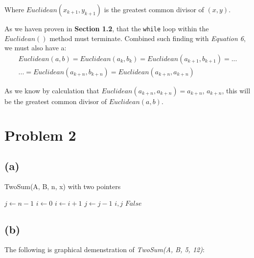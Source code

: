 \documentclass[12pt]{article}
\newcommand{\inlinecode}{\texttt}
\begin{document}
Where $Euclidean(x_{k+1}, y_{k+1})$ is the greatest common divisor of $(x, y)$.\newline


As we haven proven in \textbf{Section 1.2}, that the \inlinecode{while} loop within the $Euclidean()$ method must terminate. Combined such finding with \textit{Equation 6}, we must also have a:
\begin{gather}
    Euclidean(a, b) = Euclidean(a_{k}, b_{k}) = Euclidean(a_{k+1}, b_{k+1}) = ... \\ ... = Euclidean(a_{k+n}, b_{k+n}) = Euclidean(a_{k+n}, a_{k+n}) \nonumber
\end{gather}

As we know by calculation that $Euclidean(a_{k+n}, a_{k+n}) = a_{k+n}$, $a_{k+n}$, this will be the greatest common divisor of $Euclidean(a, b)$.

\section{Problem 2}
\subsection{(a)}

\begin{algorithm}
\caption{TwoSum(A, B, n, x) with two pointers}\label{TwoSum}
\begin{algorithmic}[1]
\Procedure{}{}
\State $j \gets n-1$
\State $i \gets 0$
        \State $i \gets i + 1$
        \State $j \gets j - 1$
    \Else
        \State \Return $i, j$
    \EndIf
\EndWhile
\State \Return $False$
\EndProcedure
\end{algorithmic}
\end{algorithm}


\subsection{(b)}

The following is graphical demenstration of \textit{TwoSum(A, B, 5, 12)}:
\end{document}
